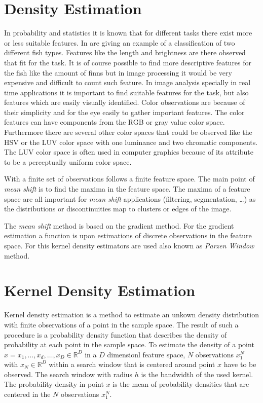 \section{Density Estimation} %
\label{sec:density_estimation}
In probability and statistics it is known that for different tasks
there exist more or less suitable features. In
\citeauthor{citeulike:167581} \citep{citeulike:167581} are giving an
example of a classification of two different fish types. Features like
the length and brightness are there observed that fit for the task. It
is of course possible to find more descriptive features for the fish
like the amount of finns but in image processing it would be very
expensive and difficult to count such feature. In image analysis
specially in real time applications it is important to find suitable
features for the task, but also features which are easily visually
identified. Color observations are because of their simplicity and for
the eye easily to gather important features. The color features can
have components from the \gls{RGB} or gray value color
space. Furthermore there are several other color spaces that could be
observed like the \gls{HSV} or the \gls{LUV} color space with one
luminance and two chromatic components. The \gls{LUV} color space is
often used in computer graphics because of its attribute to be a
perceptually uniform color space.

With a finite set of observations follows a finite feature space. The
main point of \emph{mean shift} is to find the maxima in the feature
space. The maxima of a feature space are all important for \emph{mean
  shift} applications (filtering, segmentation, \ldots) as the
distributions or discontinuities map to clusters or edges of the
image.

The \emph{mean shift} method is based on the gradient method. For the
gradient estimation a function is upon estimations of discrete
observations in the feature space. For this kernel density estimators
are used also known as \emph{Parzen Window} method.

\section{Kernel Density Estimation} %
\label{sec:kernel_density_estimation}
Kernel density estimation is a method to estimate an unkown density
distribution with finite observations of a point in the sample space.
The result of such a procedure is a probability density function that
describes the density of probability at each point in the sample
space. To estimate the density of a point $x = { x_1, \ldots , x_d,
  \ldots , x_D} \in \mathbb{R}^D$ in a $D$ dimensionl feature space,
$N$ observations $x_1^N$ with $x_N \in \mathbb{R}^D$ within a search
window that is centered around point $x$ have to be observed. The
search window with radius $h$ is the bandwidth of the used kernel. The
probability density in point $x$ is the mean of probability densities
that are centered in the $N$ observations $x_1^N$.

